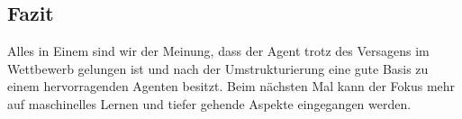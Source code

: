 \subsection{Fazit}
Alles in Einem sind wir der Meinung, dass der Agent trotz des Versagens im Wettbewerb gelungen ist und nach der Umstrukturierung eine gute Basis zu einem hervorragenden Agenten besitzt. Beim nächsten Mal kann der Fokus mehr auf maschinelles Lernen und tiefer gehende Aspekte eingegangen werden.